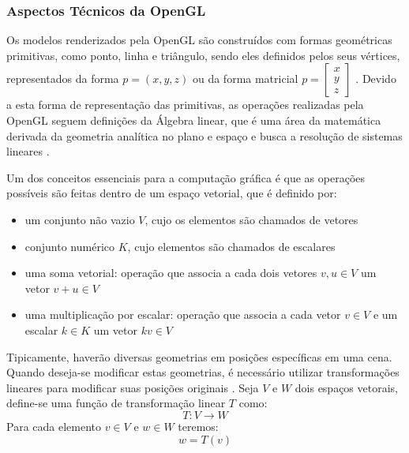 \subsubsection{Aspectos Técnicos da OpenGL}

Os modelos renderizados pela OpenGL são construídos com formas geométricas primitivas, como ponto, linha e triângulo, sendo eles definidos pelos seus vértices, representados da forma $p = (x, y, z)$ ou da forma matricial 
$
  p = \begin{bmatrix}
  x\\ 
  y\\ 
  z
  \end{bmatrix}
$ \cite{opengl8th, angel6th}. 
Devido a esta forma de representação das primitivas, as operações realizadas pela OpenGL seguem definições da Álgebra linear, que é uma área da matemática derivada da geometria analítica no plano e espaço e busca a resolução de sistemas lineares \cite{labma}. 

Um dos conceitos essenciais para a computação gráfica é que as operações possíveis são feitas dentro de um espaço vetorial, que é definido por:
\begin{itemize}
  \item um conjunto não vazio $V$, cujo os elementos são chamados de vetores
  \item conjunto numérico $K$, cujo elementos são chamados de escalares
  \item uma soma vetorial: operação que associa a cada dois vetores $ v, u \in V $ um vetor $ v + u \in V $
  \item uma multiplicação por escalar: operação que associa a cada vetor $v \in V$ e um escalar $k \in K$ um vetor $kv \in V$
\end{itemize}

Tipicamente, haverão diversas geometrias em posições específicas em uma cena. Quando deseja-se modificar estas geometrias, é necessário utilizar transformações lineares para modificar suas posições originais \cite{opengl8th}.
Seja $V$ e $W$ dois espaços vetorais, define-se \cite{alT} uma função de transformação linear $T$ como:
  \begin{equation*}
      T:V \rightarrow W
  \end{equation*}
Para cada elemento $v \in V$ e $w \in W$ teremos:
  \begin{equation*}
      w = T(v)
  \end{equation*}

